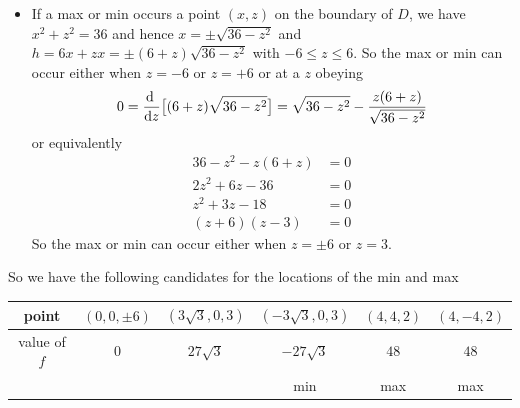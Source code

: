 \begin{solution}
\begin{itemize}
\item
If a max or min occurs a point $(x,z)$ on the boundary of $D$, we 
have  $x^2+z^2=36$ and hence $x=\pm\sqrt{36-z^2}$ and $h=6x+zx=\pm(6+z)\sqrt{36-z^2}$ with 
$-6\le z\le 6$. So the max or min can occur either when $z=-6$ or $z=+6$
or at a $z$ obeying
\begin{align*}
0=\diff{}{z}\big[(6+z)\sqrt{36-z^2}\big]
 =\sqrt{36-z^2} - \frac{z(6+z)}{\sqrt{36-z^2}}
\end{align*}
or equivalently
\begin{align*}
36-z^2-z(6+z)&=0 \\
2z^2 +6z -36 &=0 \\
z^2 +3z -18 &=0 \\
(z+6)(z-3)&=0
\end{align*}
So the max or min can occur either when $z=\pm 6$ or $z=3$.
\end{itemize}
So we have the following candidates for the locations of the min and max
\begin{center}
\renewcommand{\arraystretch}{1.3}
     \begin{tabular}{|c|c|c|c|c|c|}
     \hline
       point
       &$(0,0, \pm 6)$
       &$(3\sqrt{3},0,3)$
       &$(-3\sqrt{3},0,3)$
       &$(4,4,2) $
       &$(4,-4,2) $ \\ \hline
       value of $f$
       &$0$
       &$27\sqrt{3}$
       &$-27\sqrt{3}$
       &$48$ 
       &$48$\\ \hline
       &
       & 
       &min 
       &max
       &max \\ \hline
     \end{tabular}
\renewcommand{\arraystretch}{1.0}
\end{center}
\end{solution}

